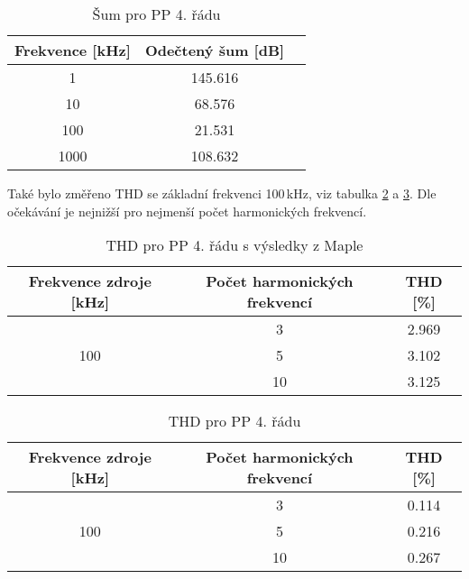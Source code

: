   \begin{table}[h]
\centering
  \begin{tabular}{ | c | c | c |}
    \hline
     Frekvence [kHz] & Odečtený šum [dB] \\ \hline
    1 & 145.616 \\ \hline
    10 & 68.576 \\ \hline
    100 & 21.531 \\ \hline
    1000 & 108.632 \\ \hline
  \end{tabular}
\caption[Šum pro PP 4. řádu]{Šum pro PP 4. řádu \label{s:THD2}}
\end{table}
\noindent Také bylo změřeno THD se základní frekvenci 100\,kHz, viz tabulka \ref{s:THD3} a \ref{s:THD4}. Dle očekávání je nejnižší pro nejmenší počet harmonických frekvencí.
\begin{table}[h]
\centering
\renewcommand{\arraystretch}{1.15}
  \begin{tabular}{ | c | c | c |}
    \hline
    Frekvence zdroje [kHz] & Počet harmonických frekvencí & THD [\%] \\ \hline
	\multirow{3}{*}{100} & 3 & 2.969\\& 5 & 3.102 \\& 10 & 3.125 \\ \hline
  \end{tabular}
  \caption[THD pro PP 4. řádu (Maple)]{THD pro PP 4. řádu s výsledky z Maple \label{s:THD3}}
\end{table}
\begin{table}[h]
\centering
\renewcommand{\arraystretch}{1.15}
  \begin{tabular}{ | c | c | c |} 
    \hline
     Frekvence zdroje [kHz] & Počet harmonických frekvencí & THD [\%] \\ \hline
	\multirow{3}{*}{100} & 3 & 0.114\\& 5 & 0.216 \\& 10 & 0.267 \\ \hline
  \end{tabular}
  \caption[THD pro PP 4. řádu]{THD pro PP 4. řádu \label{s:THD4}}
\end{table}